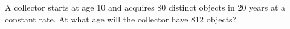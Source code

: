 A collector starts at age 10 and acquires 80 distinct objects in 20 years at a constant rate. At what age will the collector have 812 objects?
